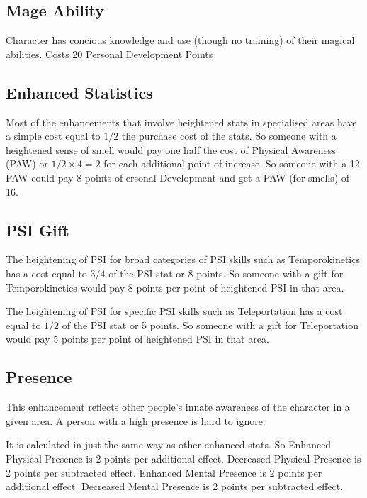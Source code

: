 \subsection{Mage Ability}

Character has concious knowledge and use (though no training) of their magical abilities.
Costs 20 Personal Development Points

\subsection{Enhanced Statistics}

Most of the enhancements that involve heightened stats in specialised areas
have a simple cost equal to $ 1/2 $ the purchase cost of the stats.
So someone with a heightened sense of smell would pay one half the cost of
Physical Awareness (PAW) or $ 1/2 \times 4  = 2$ for each additional point
of increase. So someone with a 12 PAW could pay 8 points of ersonal Development and get a PAW (for
smells) of 16.

\subsection{PSI Gift}

The heightening of PSI for broad categories of PSI skills such as
Temporokinetics has a cost equal to $ 3/4 $ of the PSI stat or 8 points.
So someone with a gift for Temporokinetics would pay 8 points per point of
heightened PSI in that area. 

The heightening of PSI for specific PSI skills such as
Teleportation has a cost equal to $ 1/2 $ of the PSI stat or 5 points.
So someone with a gift for Teleportation would pay 5 points per point of
heightened PSI in that area. 

\subsection{Presence}

This enhancement reflects other people's innate awareness of the character
in a given area. A person with a high presence is hard to ignore.

It is calculated in just the same way as other enhanced stats. So
Enhanced Physical Presence is 2 points per additional effect.
Decreased Physical Presence is 2 points per subtracted effect.
Enhanced Mental Presence is 2 points per additional effect.
Decreased Mental Presence is 2 points per subtracted effect.

